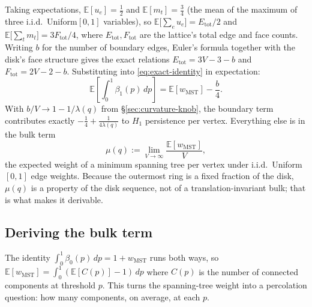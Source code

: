 \documentclass[11pt]{article}
\begin{document}
Taking expectations, $\mathbb{E}[u_e]=\tfrac12$ and $\mathbb{E}[m_t]=\tfrac34$ (the mean of the maximum of three i.i.d.\ Uniform$[0,1]$ variables), so $\mathbb{E}\big[\sum_e u_e\big]=E_{\mathrm{tot}}/2$ and $\mathbb{E}\big[\sum_t m_t\big]=3F_{\mathrm{tot}}/4$, where $E_{\mathrm{tot}},F_{\mathrm{tot}}$ are the lattice's total edge and face counts. Writing $b$ for the number of boundary edges, Euler's formula together with the disk's face structure gives the exact relations $E_{\mathrm{tot}}=3V-3-b$ and $F_{\mathrm{tot}}=2V-2-b$. Substituting into \eqref{eq:exact-identity} in expectation:
\begin{equation}
\mathbb{E}\left[\int_0^1\beta_1(p)\,dp\right] = \mathbb{E}[w_{\mathrm{MST}}] - \frac{b}{4}.
\label{eq:reduced-identity}
\end{equation}
With $b/V\to1-1/\lambda(q)$ from \S\ref{sec:curvature-knob}, the boundary term contributes exactly $-\tfrac14+\tfrac{1}{4\lambda(q)}$ to $H_1$ persistence per vertex. Everything else is in the bulk term
\[
\mu(q) := \lim_{V\to\infty}\frac{\mathbb{E}[w_{\mathrm{MST}}]}{V},
\]
the expected weight of a minimum spanning tree per vertex under i.i.d.\ Uniform$[0,1]$ edge weights. Because the outermost ring is a fixed fraction of the disk, $\mu(q)$ is a property of the disk sequence, not of a translation-invariant bulk; that is what makes it derivable.

\subsection{Deriving the bulk term}
\label{sec:bulk}

The identity $\int_0^1\beta_0(p)\,dp=1+w_{\mathrm{MST}}$ runs both ways, so $\mathbb{E}[w_{\mathrm{MST}}]=\int_0^1(\mathbb{E}[C(p)]-1)\,dp$ where $C(p)$ is the number of connected components at threshold $p$. This turns the spanning-tree weight into a percolation question: how many components, on average, at each $p$.
\end{document}
